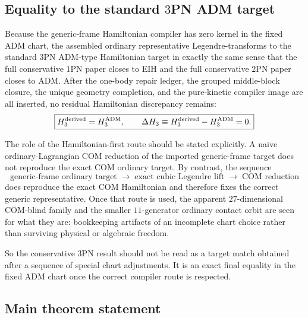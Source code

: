 \documentclass[11pt]{article}
\begin{document}
\subsection{Equality to the standard \texorpdfstring{$3$}{3}PN ADM target}
\label{sec:final-adm}

Because the generic-frame Hamiltonian compiler has zero kernel in the fixed ADM
chart, the assembled ordinary representative Legendre-transforms to the standard
$3$PN ADM-type Hamiltonian target in exactly the same sense that the full
conservative $1$PN paper closes to EIH and the full conservative $2$PN paper
closes to ADM.  After the one-body repair ledger, the grouped middle-block
closure, the unique geometry completion, and the pure-kinetic compiler image are
all inserted, no residual Hamiltonian discrepancy remains:
\begin{equation}
\boxed{
H_3^{\rm derived}=H_3^{\rm ADM},
\qquad
\Delta H_3
\equiv
H_3^{\rm derived}-H_3^{\rm ADM}=0.
}
\label{eq:final-adm-equality}
\end{equation}

The role of the Hamiltonian-first route should be stated explicitly.  A naive
ordinary-Lagrangian COM reduction of the imported generic-frame target does not
reproduce the exact COM ordinary target.  By contrast, the sequence
\[
\text{generic-frame ordinary target}
\;\longrightarrow\;
\text{exact cubic Legendre lift}
\;\longrightarrow\;
\text{COM reduction}
\]
does reproduce the exact COM Hamiltonian and therefore fixes the correct generic
representative.  Once that route is used, the apparent $27$-dimensional
COM-blind family and the smaller $11$-generator ordinary contact orbit are seen
for what they are: bookkeeping artifacts of an incomplete chart choice rather
than surviving physical or algebraic freedom.

So the conservative $3$PN result should not be read as a target match obtained
after a sequence of special chart adjustments.  It is an exact final equality in
the fixed ADM chart once the correct compiler route is respected.

\subsection{Main theorem statement}
\label{sec:final-main}
\end{document}
